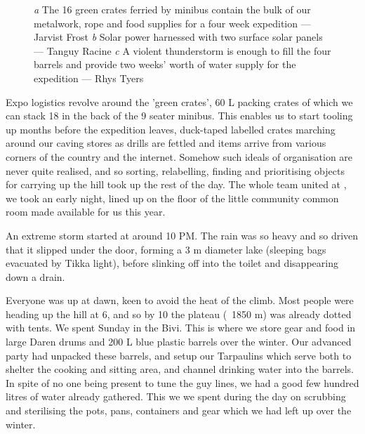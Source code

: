 \begin{figure*}[t!]
\checkoddpage \ifoddpage \forcerectofloat \else \forceversofloat \fi
\centering
    \begin{subfigure}[t]{0.413\textwidth}
        \centering
        \caption{} \label{ben with crates}
    \end{subfigure}
        \hfill
\begin{subfigure}[t]{0.577\textwidth}
\centering
{}
 \caption{}\label{solar panels}
\end{subfigure}
\vfill
\begin{subfigure}[t]{\textwidth}
\centering
{}
 \caption{}\label{full barrel}
\end{subfigure}
  \caption{
    \emph{a} The 16 green crates ferried by minibus contain the bulk of our metalwork, rope and food supplies for a four week expedition --- Jarvist Frost
     \emph{b}  Solar power harnessed with two surface solar panels --- Tanguy Racine
     \emph{c}  A violent thunderstorm is enough to fill the four barrels and provide two weeks' worth of water supply for the expedition ---  Rhys Tyers}
\end{figure*}


Expo logistics revolve around the 'green crates', 60 L packing crates of which we can stack 18 in the back of the 9 seater minibus. This enables us to start tooling up months before the expedition leaves, duck-taped labelled crates marching around our caving stores as drills are fettled and items arrive from various corners of the country and the internet. Somehow such ideals of organisation are never quite realised, and so sorting, relabelling, finding and prioritising objects for carrying up the hill took up the rest of the day. The whole team united at , we took an early night, lined up on the floor of the little community common room made available for us this year. 

An extreme storm started at around 10 PM. The rain was so heavy and so driven that it slipped under the door, forming a 3 m diameter lake (sleeping bags evacuated by Tikka light), before slinking off into the toilet and disappearing down a drain.

Everyone was up at dawn, keen to avoid the heat of the climb. Most people were heading up the hill at 6, and so by 10 the plateau (~1850 m) was already dotted with tents. We spent Sunday in the Bivi. This is where we store gear and food in large Daren drums and 200 L blue plastic barrels over the winter. Our advanced party had unpacked these barrels, and setup our Tarpaulins which serve both to shelter the cooking and sitting area, and channel drinking water into the barrels. In spite of no one being present to tune the guy lines, we had a good few hundred litres of water already gathered. This we we spent during the day on scrubbing and sterilising the pots, pans, containers and gear which we had left up over the winter. 

